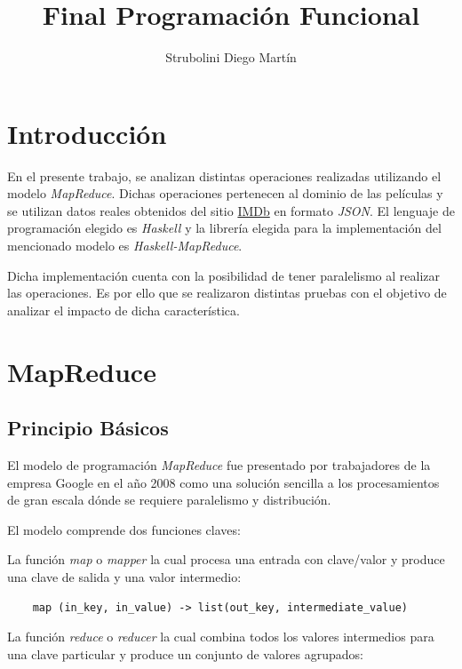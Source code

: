 \documentclass[a4paper,11pt]{article}
\begin{document}
\title{Final Programación Funcional}
\author{Strubolini Diego Martín}

\maketitle

\section{Introducción}

En el presente trabajo, se analizan distintas operaciones realizadas utilizando el modelo \textit{MapReduce}. Dichas operaciones pertenecen al dominio de las películas y se utilizan datos reales obtenidos del sitio \href{http://IMDb.com}{IMDb} en formato \textit{JSON}. El lenguaje de programación elegido es \textit{Haskell} y la librería elegida para la implementación del mencionado modelo es \textit{Haskell-MapReduce}.

Dicha implementación cuenta con la posibilidad de tener paralelismo al realizar las operaciones. Es por ello que se realizaron distintas pruebas con el objetivo de analizar el impacto de dicha característica.

\section{MapReduce}

\subsection{Principio Básicos}

El modelo de programación \textit{MapReduce} fue presentado por trabajadores de la empresa Google en el año 2008 \cite{dean2008mapreduce} como una solución sencilla a los procesamientos de gran escala dónde se requiere paralelismo y distribución.

El modelo comprende dos funciones claves:

La función \textit{map} o \textit{mapper} la cual procesa una entrada con clave/valor y produce una clave de salida y una valor intermedio:

\begin{lstlisting}
	map (in_key, in_value) -> list(out_key, intermediate_value)
\end{lstlisting}

La función \textit{reduce} o \textit{reducer} la cual combina todos los valores intermedios para una clave particular y produce un conjunto de valores agrupados:
\end{document}
